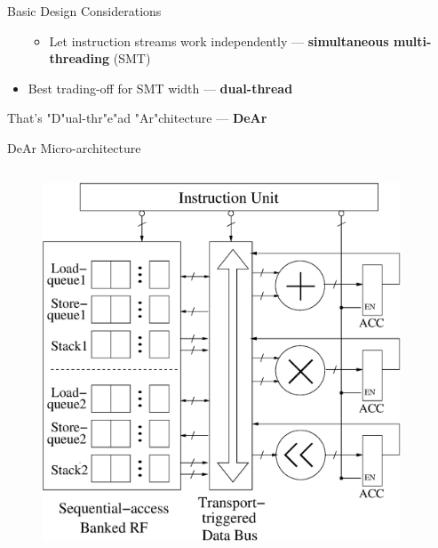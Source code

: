 \documentclass{beamer}
\begin{document}
\begin{CJK}{UTF8}{bkai}
\begin{frame}{Basic Design Considerations}
\begin{itemize}
\begin{itemize}
                            \item Let instruction streams work independently --- \textbf{simultaneous multi-threading} (SMT)
                        \end{itemize}
                    \item Best trading-off for SMT width --- \textbf{dual-thread}
                \end{itemize}
                \begin{center}
                {\large{That's "D"ual-thr"e"ad "Ar"chitecture --- \textbf{DeAr}}}
                \end{center}
            \end{frame}

            \begin{frame}{DeAr Micro-architecture}
                \begin{columns}
                    \begin{column}{0.6\textwidth}
                        \begin{figure}[!ht] 
                            \centering
                            \includegraphics[width=1.0\textwidth]{./figs/micro.eps}
                        \end{figure}
                    \end{column}
                    \begin{column}{0.35\textwidth}

\end{column}
\end{columns}
\end{frame}
\end{CJK}
\end{document}
